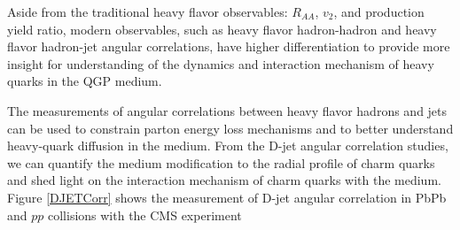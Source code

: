 Aside from the traditional heavy flavor observables: $R_{AA}$, $v_{2}$, and production yield ratio, modern observables, such as heavy flavor hadron-hadron and heavy flavor hadron-jet angular correlations, have higher differentiation to provide more insight for understanding of the dynamics and interaction mechanism of heavy quarks in the QGP medium. 

The measurements of angular correlations between heavy flavor hadrons and jets can be used to constrain parton energy loss mechanisms and to better understand heavy-quark diffusion in the medium. From the D-jet angular correlation studies, we can quantify the medium modification to the radial profile of charm quarks and shed light on the interaction mechanism of charm quarks with the medium. Figure \ref{DJETCorr} shows the measurement of D-jet angular correlation in PbPb and $pp$ collisions with the CMS experiment \cite{CMSDJet}

